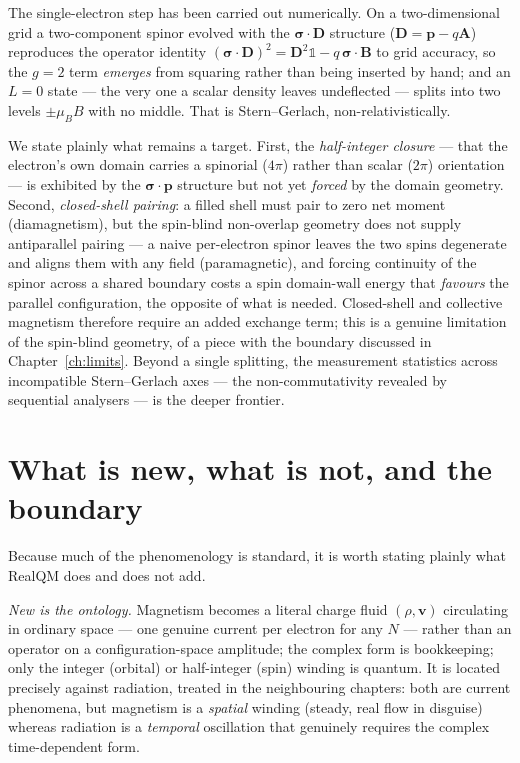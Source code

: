 The single-electron step has been carried out numerically. On a two-dimensional grid a two-component spinor
evolved with the $\boldsymbol{\sigma}\cdot\mathbf{D}$ structure ($\mathbf{D} = \mathbf{p} - q\mathbf{A}$)
reproduces the operator identity $(\boldsymbol{\sigma}\cdot\mathbf{D})^2 = \mathbf{D}^2\mathbb{1} -
q\,\boldsymbol{\sigma}\cdot\mathbf{B}$ to grid accuracy, so the $g = 2$ term \emph{emerges} from squaring rather
than being inserted by hand; and an $L = 0$ state --- the very one a scalar density leaves undeflected --- splits
into two levels $\pm\mu_B B$ with no middle. That is Stern--Gerlach, non-relativistically.

We state plainly what remains a target. First, the \emph{half-integer closure} --- that the electron's own domain
carries a spinorial ($4\pi$) rather than scalar ($2\pi$) orientation --- is exhibited by the
$\boldsymbol{\sigma}\cdot\mathbf{p}$ structure but not yet \emph{forced} by the domain geometry. Second,
\emph{closed-shell pairing}: a filled shell must pair to zero net moment (diamagnetism), but the spin-blind
non-overlap geometry does not supply antiparallel pairing --- a naive per-electron spinor leaves the two spins
degenerate and aligns them with any field (paramagnetic), and forcing continuity of the spinor across a shared
boundary costs a spin domain-wall energy that \emph{favours} the parallel configuration, the opposite of what is
needed. Closed-shell and collective magnetism therefore require an added exchange term; this is a genuine
limitation of the spin-blind geometry, of a piece with the boundary discussed in Chapter~\ref{ch:limits}.
Beyond a single splitting, the measurement statistics across incompatible Stern--Gerlach axes --- the
non-commutativity revealed by sequential analysers --- is the deeper frontier.

\section{What is new, what is not, and the boundary}\label{sec:magnetism-ledger}

Because much of the phenomenology is standard, it is worth stating plainly what RealQM does and does not add.

\emph{New is the ontology.} Magnetism becomes a literal charge fluid $(\rho, \mathbf{v})$ circulating in ordinary
space --- one genuine current per electron for any $N$ --- rather than an operator on a configuration-space
amplitude; the complex form is bookkeeping; only the integer (orbital) or half-integer (spin) winding is quantum.
It is located precisely against radiation, treated in the neighbouring chapters: both are current phenomena, but
magnetism is a \emph{spatial} winding (steady, real flow in disguise) whereas radiation is a \emph{temporal}
oscillation that genuinely requires the complex time-dependent form.

